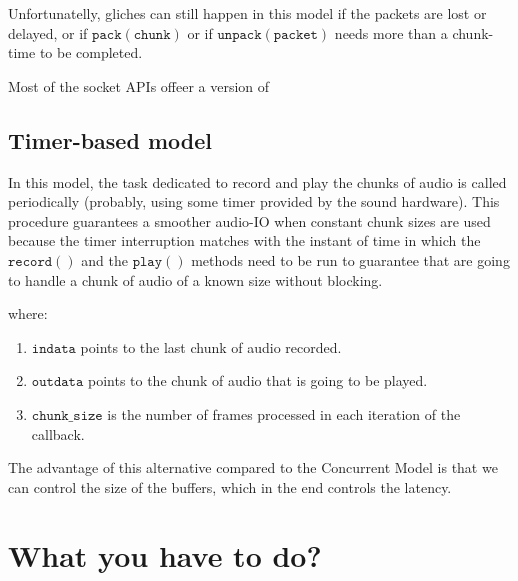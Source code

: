 Unfortunatelly, gliches can still happen in this model if the packets
are lost or delayed, or if $\mathtt{pack(chunk)}$ or if
$\mathtt{unpack(packet)}$ needs more than a chunk-time to be
completed.

Most of the socket APIs offeer a version of 

\subsection{Timer-based model}

In this model, the task dedicated to record and play the chunks of
audio is called periodically (probably, using some timer provided by
the sound hardware). This procedure guarantees a smoother audio-IO
when constant chunk sizes are used because the timer interruption
matches with the instant of time in which the $\mathtt{record()}$ and
the $\mathtt{play()}$ methods need to be run to guarantee that are
going to handle a chunk of audio of a known size without blocking.


\begin{pseudocode}{Timer-based\_InterCom}{~}
  \BEGIN
     \GETS {}\\
    \\
    \mathtt{
    \mathtt{send(outgoing\_packet)}\\
    \mathtt{play}(\mathtt{chunk\_to\_play})\\
  \END
  \ENDPROCEDURE
\end{pseudocode}

where:
\begin{enumerate}
\item $\mathtt{indata}$ points to the last chunk of audio recorded.
\item $\mathtt{outdata}$ points to the chunk of audio that is going to be played.
\item $\mathtt{chunk\_size}$ is the number of frames processed in each iteration of the callback.
\end{enumerate}

The advantage of this alternative compared to the Concurrent Model is
that we can control the size of the buffers, which in the end controls the latency.

\section{What you have to do?}

